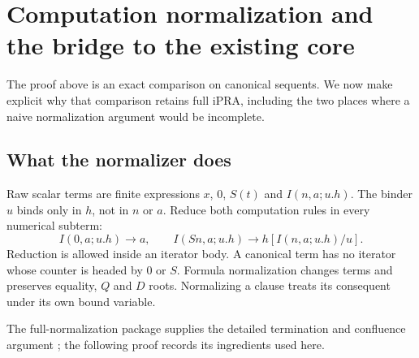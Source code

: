 \section{Computation normalization and the bridge to the existing core}
\label{sec:normal-bridge}

The proof above is an exact comparison on canonical sequents. We now make
explicit why that comparison retains full iPRA, including the two places
where a naive normalization argument would be incomplete.

\subsection{What the normalizer does}

Raw scalar terms are finite expressions $x$, $0$, $S(t)$ and
$I(n,a;u.h)$. The binder $u$ binds only in $h$, not in $n$ or $a$.
Reduce both computation rules in every numerical subterm:
\[
 I(0,a;u.h)\longrightarrow a,\qquad
 I(Sn,a;u.h)\longrightarrow h[I(n,a;u.h)/u].
\]
Reduction is allowed inside an iterator body. A canonical term has no
iterator whose counter is headed by $0$ or $S$. Formula normalization
changes terms and preserves equality, $Q$ and $D$ roots.
Normalizing a clause treats its consequent under its own bound variable.

The full-normalization package supplies the detailed termination and
confluence argument \cite{normal}; the following proof records its
ingredients used here.

